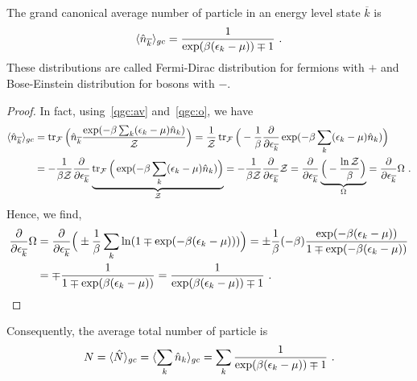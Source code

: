     The grand canonical average number of particle in an energy level state $\overline k$ is 
    \begin{equation}\label{fdbe}
        \langle\hat n_{\overline k}\rangle_{gc} = \frac{1}{\exp(\beta(\epsilon_k - \mu))\mp 1} ~.
    \end{equation}
    These distributions are called Fermi-Dirac distribution for fermions with $+$ and Bose-Einstein distribution for bosons with $-$.
    \begin{proof}
        In fact, using~\eqref{qgc:av} and~\eqref{qgc:o}, we have
        \begin{equation*}
        \begin{aligned}
            \langle\hat n_{\overline k}\rangle_{gc} & = \operatorname{tr}_{\mathcal F} \Big (\hat n_{\overline k} \frac{\exp (-\beta \sum_k (\epsilon_k - \mu) \hat n_k)}{\mathcal Z} \Big) = \frac{1}{\mathcal Z} \operatorname{tr}_{\mathcal F} \Big (- \frac{1}{\beta} \frac{\partial}{\partial\epsilon_{\overline k}} \exp (-\beta \sum_k (\epsilon_k - \mu) \hat n_k) \Big) \\ & = - \frac{1}{\beta \mathcal Z} \frac{\partial}{\partial\epsilon_{\overline k}} \underbrace{\operatorname{tr}_{\mathcal F} \Big ( \exp (-\beta \sum_k (\epsilon_k - \mu) \hat n_k) \Big)}_{\mathcal Z} = - \frac{1}{\beta \mathcal Z} \frac{\partial}{\partial\epsilon_{\overline k}} \mathcal Z = \frac{\partial}{\partial\epsilon_{\overline k}} \underbrace{\Big ( - \frac{\ln \mathcal Z}{\beta} \Big)}_\Omega = \frac{\partial}{\partial\epsilon_{\overline k}} \Omega ~.
        \end{aligned}
        \end{equation*}
        Hence, we find, 
        \begin{equation*}
        \begin{aligned}
            \frac{\partial}{\partial\epsilon_{\overline k}} \Omega & = \frac{\partial}{\partial\epsilon_{\overline k}}  \Big (\pm \frac{1}{\beta} \sum_k \ln (1 \mp \exp (-\beta (\epsilon_k - \mu)) ) \Big ) = \pm \frac{1}{\beta} (- \beta) \frac{\exp(- \beta(\epsilon_k - \mu))}{1 \mp \exp(- \beta(\epsilon_k - \mu))} \\ & = \mp \frac{1}{1 \mp \exp(\beta(\epsilon_k - \mu))} = \frac{1}{\exp(\beta(\epsilon_k - \mu))\mp 1} ~.
        \end{aligned}
        \end{equation*}
    \end{proof}
    Consequently, the average total number of particle is 
    \begin{equation}\label{qg:n1}
        N = \langle\hat N\rangle_{gc} = \langle\sum_k \hat n_k\rangle_{gc} = \sum_k \frac{1}{\exp(\beta(\epsilon_k - \mu))\mp 1} ~.
    \end{equation}
